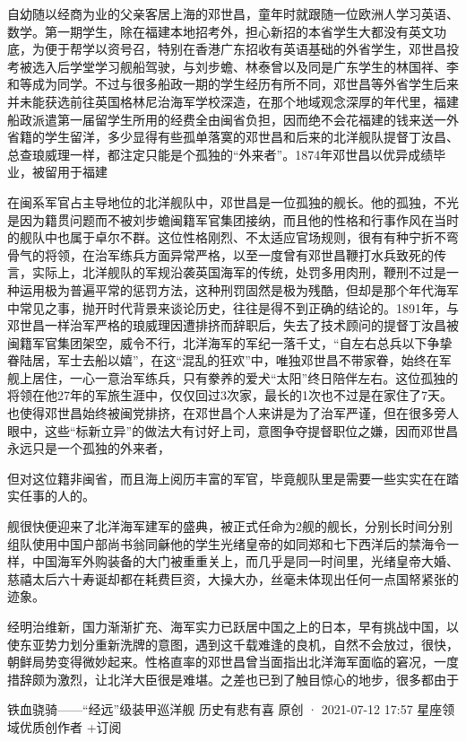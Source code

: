 \documentclass[12pt,UTF8]{ctexbook}
\begin{document}
自幼随以经商为业的父亲客居上海的邓世昌，童年时就跟随一位欧洲人学习英语、数学。第一期学生，除在福建本地招考外，担心新招的本省学生大都没有英文功底，为便于帮学以资号召，特别在香港广东招收有英语基础的外省学生，邓世昌投考被选入后学堂学习舰船驾驶，与刘步蟾、林泰曾以及同是广东学生的林国祥、李和等成为同学。不过与很多船政一期的学生经历有所不同，邓世昌等外省学生后来并未能获选前往英国格林尼治海军学校深造，在那个地域观念深厚的年代里，福建船政派遣第一届留学生所用的经费全由闽省负担，因而绝不会花福建的钱来送一外省籍的学生留洋，多少显得有些孤单落寞的邓世昌和后来的北洋舰队提督丁汝昌、总查琅威理一样，都注定只能是个孤独的“外来者”。1874年邓世昌以优异成绩毕业，被留用于福建

在闽系军官占主导地位的北洋舰队中，邓世昌是一位孤独的舰长。他的孤独，不光是因为籍贯问题而不被刘步蟾闽籍军官集团接纳，而且他的性格和行事作风在当时的舰队中也属于卓尔不群。这位性格刚烈、不太适应官场规则，很有有种宁折不弯骨气的将领，在治军练兵方面异常严格，以至一度曾有邓世昌鞭打水兵致死的传言，实际上，北洋舰队的军规沿袭英国海军的传统，处罚多用肉刑，鞭刑不过是一种运用极为普遍平常的惩罚方法，这种刑罚固然是极为残酷，但却是那个年代海军中常见之事，抛开时代背景来谈论历史，往往是得不到正确的结论的。1891年，与邓世昌一样治军严格的琅威理因遭排挤而辞职后，失去了技术顾问的提督丁汝昌被闽籍军官集团架空，威令不行，北洋海军的军纪一落千丈，“自左右总兵以下争挚眷陆居，军士去船以嬉”，在这“混乱的狂欢”中，唯独邓世昌不带家眷，始终在军舰上居住，一心一意治军练兵，只有豢养的爱犬“太阳”终日陪伴左右。这位孤独的将领在他27年的军旅生涯中，仅仅回过3次家，最长的1次也不过是在家住了7天。也使得邓世昌始终被闽党排挤，在邓世昌个人来讲是为了治军严谨，但在很多旁人眼中，这些“标新立异”的做法大有讨好上司，意图争夺提督职位之嫌，因而邓世昌永远只是一个孤独的外来者，

但对这位籍非闽省，而且海上阅历丰富的军官，毕竟舰队里是需要一些实实在在踏实任事的人的。

舰很快便迎来了北洋海军建军的盛典，被正式任命为2舰的舰长，分别长时间分别组队使用中国户部尚书翁同龢他的学生光绪皇帝的如同郑和七下西洋后的禁海令一样，中国海军外购装备的大门被重重关上，而几乎是同一时间里，光绪皇帝大婚、慈禧太后六十寿诞却都在耗费巨资，大操大办，丝毫未体现出任何一点国帑紧张的迹象。

经明治维新，国力渐渐扩充、海军实力已跃居中国之上的日本，早有挑战中国，以使东亚势力划分重新洗牌的意图，遇到这千载难逢的良机，自然不会放过，很快，朝鲜局势变得微妙起来。性格直率的邓世昌曾当面指出北洋海军面临的窘况，一度措辞颇为激烈，让北洋大臣很是难堪。之差也已到了触目惊心的地步，很多都由于

铁血骁骑——“经远”级装甲巡洋舰
历史有悲有喜
原创 ·  2021-07-12 17:57
星座领域优质创作者
+订阅
\end{document}

